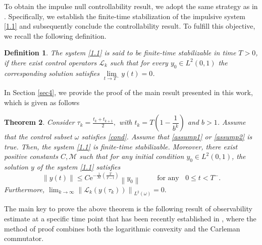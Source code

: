 \documentclass[sn-mathphys]{sn-jnl}
\newtheorem{theorem}{Theorem}[section]
\newtheorem{definition}[theorem]{Definition}
\begin{document}
To obtain the impulse null controllability result, we adopt the same strategy as in \cite{Coron2017, pkm1}. Specifically, we establish the finite-time stabilization of the impulsive system \eqref{1.1} and subsequently conclude the controllability result. To fulfill this objective, we recall the following definition.
    \begin{definition}
        The system \eqref{1.1} is said to be finite-time stabilizable in time $T>0$, if there exist control operators $\mathcal{L}_{k}$ such that for every $y_0 \in L^2(0,1)$ the corresponding solution satisfies $\lim\limits_{t\to T^-} y(t)=0$.
    \end{definition}
In Section \ref{sec4}, we provide the proof of the main result presented in this work, which is given as follows
\begin{theorem}\label{thm1.4}
Consider $\tau_{k} = \frac{t_{k} + t_{k+1} }{2},$ with $t_{k}=T\left( 1-\dfrac{1}{b^k} \right)$ and $b>1$. Assume that the control subset \(\omega\) satisfies \eqref{cond}. Assume that \eqref{assump1} or \eqref{assump2} is true. Then, the system \eqref{1.1} is finite-time stabilizable. Moreover, there exist positive constants $C,\mathcal{M}$ such that for any initial condition $y_0 \in L^2(0,1)$, the solution $y$ of the system \eqref{1.1} satisfies
\begin{equation*}
\|y(t)\| \leq C \mathrm{e}^{-\frac{1}{\mathcal{M}}\left(\frac{T}{T-t}\right)} \left\|y_{0}\right\| \qquad \text { for any } \;\;0 \leq t<T^{-}.
\end{equation*}
Furthermore,
$\displaystyle \lim _{k \rightarrow \infty}\left\|\mathcal{L}_{k}\left(y\left(\tau_{k}\right)\right)\right\|_{L^2(\omega)}=0.$
\end{theorem}
The main key to prove the above theorem is the following result of observability estimate at a specific time point  that has been recently established in \citep{MMOS}, where the method of proof combines both the logarithmic convexity and the Carleman commutator.
\end{document}
